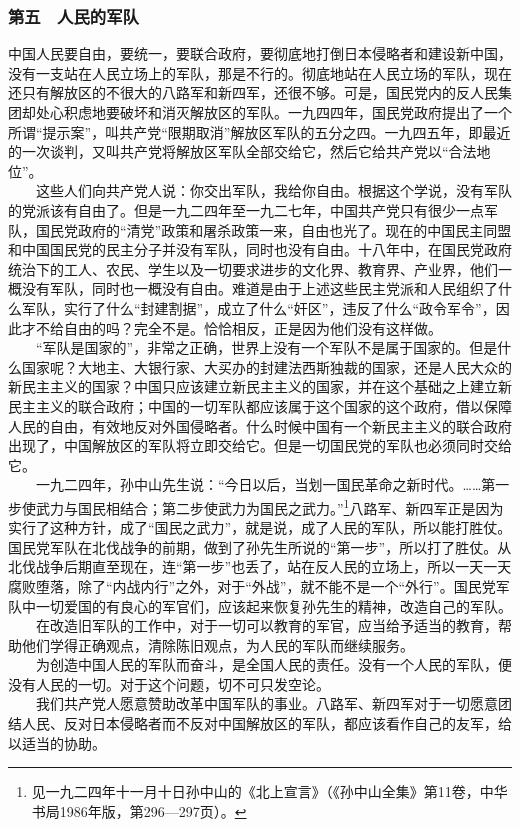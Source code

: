 \documentclass[cn,11pt,chinese]{elegantbook}
\def\myformat#1{\hfil\hfil #1}
\begin{document}
\subsubsection*{\myformat{第五　人民的军队}}
中国人民要自由，要统一，要联合政府，要彻底地打倒日本侵略者和建设新中国，没有一支站在人民立场上的军队，那是不行的。彻底地站在人民立场的军队，现在还只有解放区的不很大的八路军和新四军，还很不够。可是，国民党内的反人民集团却处心积虑地要破坏和消灭解放区的军队。一九四四年，国民党政府提出了一个所谓“提示案”，叫共产党“限期取消”解放区军队的五分之四。一九四五年，即最近的一次谈判，又叫共产党将解放区军队全部交给它，然后它给共产党以“合法地位”。\\
　　这些人们向共产党人说：你交出军队，我给你自由。根据这个学说，没有军队的党派该有自由了。但是一九二四年至一九二七年，中国共产党只有很少一点军队，国民党政府的“清党”政策和屠杀政策一来，自由也光了。现在的中国民主同盟和中国国民党的民主分子并没有军队，同时也没有自由。十八年中，在国民党政府统治下的工人、农民、学生以及一切要求进步的文化界、教育界、产业界，他们一概没有军队，同时也一概没有自由。难道是由于上述这些民主党派和人民组织了什么军队，实行了什么“封建割据”，成立了什么“奸区”，违反了什么“政令军令”，因此才不给自由的吗？完全不是。恰恰相反，正是因为他们没有这样做。\\
　　“军队是国家的”，非常之正确，世界上没有一个军队不是属于国家的。但是什么国家呢？大地主、大银行家、大买办的封建法西斯独裁的国家，还是人民大众的新民主主义的国家？中国只应该建立新民主主义的国家，并在这个基础之上建立新民主主义的联合政府；中国的一切军队都应该属于这个国家的这个政府，借以保障人民的自由，有效地反对外国侵略者。什么时候中国有一个新民主主义的联合政府出现了，中国解放区的军队将立即交给它。但是一切国民党的军队也必须同时交给它。\\
　　一九二四年，孙中山先生说：“今日以后，当划一国民革命之新时代。……第一步使武力与国民相结合；第二步使武力为国民之武力。”\footnote[20]{  见一九二四年十一月十日孙中山的《北上宣言》（《孙中山全集》第11卷，中华书局1986年版，第296—297页）。}八路军、新四军正是因为实行了这种方针，成了“国民之武力”，就是说，成了人民的军队，所以能打胜仗。国民党军队在北伐战争的前期，做到了孙先生所说的“第一步”，所以打了胜仗。从北伐战争后期直至现在，连“第一步”也丢了，站在反人民的立场上，所以一天一天腐败堕落，除了“内战内行”之外，对于“外战”，就不能不是一个“外行”。国民党军队中一切爱国的有良心的军官们，应该起来恢复孙先生的精神，改造自己的军队。\\
　　在改造旧军队的工作中，对于一切可以教育的军官，应当给予适当的教育，帮助他们学得正确观点，清除陈旧观点，为人民的军队而继续服务。\\
　　为创造中国人民的军队而奋斗，是全国人民的责任。没有一个人民的军队，便没有人民的一切。对于这个问题，切不可只发空论。\\
　　我们共产党人愿意赞助改革中国军队的事业。八路军、新四军对于一切愿意团结人民、反对日本侵略者而不反对中国解放区的军队，都应该看作自己的友军，给以适当的协助。\\
\end{document}
